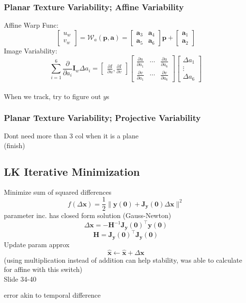 \documentclass{article}
\begin{document}
\subsubsection{{Planar Texture Variability; Affine Variability}}
Affine Warp Func:
\[
    \begin{bmatrix}
        u_w \\ v_w
    \end{bmatrix} = \mathcal W_a (\mathbf p, \mathbf a) = 
    \begin{bmatrix}
        \mathbf a_3 & \mathbf a_4\\
        \mathbf a_5 & \mathbf a_6
    \end{bmatrix}\mathbf p +
    \begin{bmatrix}
        \mathbf a_1 \\
        \mathbf a_2
    \end{bmatrix}
\]
Image Variability:
\[
    \sum_{i=1}^{6}\frac{\partial}{\partial a_i} \mathbf I_w \Delta a_i
    = \begin{bmatrix}
        \frac{\partial I}{\partial u} , \frac{\partial I}{\partial v}
    \end{bmatrix}
    \begin{bmatrix}
        \frac{\partial u}{\partial a_1} & \cdots & \frac{\partial u}{\partial a_6}\\
        \frac{\partial v}{\partial a_1} & \cdots & \frac{\partial v}{\partial a_6}
    \end{bmatrix}
    \begin{bmatrix}
        \Delta a_1 \\ \vdots \\ \Delta a_6
    \end{bmatrix}
\]
\\
When we track, try to figure out $y$s
\subsubsection{Planar Texture Variability; Projective Variability}
Dont need more than 3 col when it is a plane \\(finish)


\subsection{LK Iterative Minimization}
Minimize sum of squared differences
\[
    f(\Delta \mathbf x) = \frac12 \|\mathbf y(\mathbf 0) +\mathbf J_\mathbf y (\mathbf 0)\Delta \mathbf x \|^2
\]
parameter inc. has closed form solution (Gauss-Newton)
\[
    \Delta \mathbf x = -\mathbf H ^{-1} \mathbf J _\mathbf y (\mathbf 0)^\top \mathbf y(\mathbf 0)
\]  
\[
    \mathbf H = \mathbf J _\mathbf y (\mathbf 0 )^\top \mathbf J_\mathbf y (\mathbf 0)
\]
Update param approx
\[
    \hat {\mathbf x} \gets \hat {\mathbf x} + \Delta \mathbf x 
\]
(using multiplication instead of addition can help stability, was able to calculate for affine with this switch)
\\
Slide 34-40
\begin{list}{}{}
    \item error akin to temporal difference
\end{list}
\end{document}
